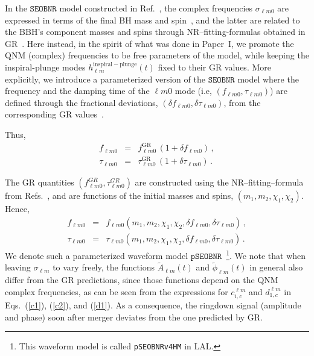 \documentclass[twocolumn,prd,aps,superscriptaddress,preprintnumbers,tightenlines,showpacs,nofootinbib,eqsecnum,amsfonts,amsmath]{revtex4-1}
\newcommand{\paperone}{Paper~I\xspace}
\newcommand{\pSEOB}{\texttt{pSEOBNR}}
\newcommand{\SEOB}{\texttt{SEOBNR}}
\begin{document}
In the $\SEOB$ model constructed in Ref.~\cite{Cotesta:2018fcv}, the
complex frequencies $\sigma_{\ell m 0}$ are expressed in terms of the
final BH mass and spin~\cite{Berti:2005ys,Berti:2009kk}, and the
latter are related to the BBH's component masses and spins through
NR--fitting-formulas obtained in
GR~\cite{Taracchini:2013rva,Hofmann:2016yih}. Here instead, in the
spirit of what was done in \paperone, we promote the QNM (complex)
frequencies to be free parameters of the model, while keeping the
inspiral-plunge modes $h_{\ell m}^\mathrm{inspiral-plunge}(t)$ fixed
to their GR values. More explicitly, we introduce a parameterized
version of the $\SEOB$ model where the frequency and the
damping time of the ${\ell m 0}$ mode (i.e, $(f_{\ell m 0}, \tau
_{\ell m 0})$) are defined through the fractional deviations, $(\delta
f_{\ell m 0},\delta \tau_{\ell m 0})$, from the corresponding GR
values~\cite{Gossan:2011ha,Meidam:2014jpa}.


Thus,
\begin{subequations}
\begin{eqnarray}
f_{\ell m 0} &=& f_{\ell m 0}^{\text{GR}}\, (1 + \delta f_{\ell m 0})\,,\label{eq:nongr_freqs_a} \\ 
\tau _{\ell m 0} &=& \tau _{\ell m 0}^{\text{GR}}\, (1 + \delta \tau_{\ell m 0})\,. \label{eq:nongr_freqs_b}
\end{eqnarray}
\end{subequations}

The GR quantities $( f_{\ell m 0}^{GR},\tau_{\ell m 0}^{GR})$ are
constructed using the NR--fitting--formula from Refs.~\cite{Taracchini:2013rva,Hofmann:2016yih}, and are functions of the initial masses and spins, $(m_1, m_2, \chi_1, \chi_2)$. Hence,
\begin{subequations}
\begin{eqnarray}
f_{\ell m 0} &=& f_{\ell m 0}(m_1, m_2, \chi_1, \chi_2, \delta f_{\ell m 0}, \delta \tau_{\ell m 0})\,,\\ 
\tau _{\ell m 0} &=& \tau _{\ell m 0}(m_1, m_2, \chi_1, \chi_2, \delta f_{\ell m 0}, \delta \tau_{\ell m 0})\,.
\end{eqnarray}
\end{subequations}
We denote such a parameterized waveform model $\pSEOB$~\footnote{This
waveform model is called {\tt pSEOBNRv4HM} in LAL.}. We note that when leaving $\sigma_{\ell m}$ to vary
freely, the functions $\tilde{A}_{\ell m}(t)$ and $\tilde{\phi}_{\ell
  m}(t)$ in general also differ from the GR predictions, since
those functions depend on the QNM complex frequencies, as can be seen
from the expressions for $c_{i,c}^{\ell m}$ and $d_{1,c}^{\ell m}$ in Eqs.~(\ref{c1}),
(\ref{c2}), and (\ref{d1}). As a consequence, the ringdown signal (amplitude and phase) 
soon after merger deviates from the one predicted by GR.
\end{document}

